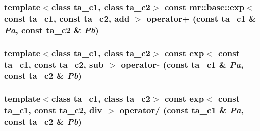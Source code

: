 \subsubsection{\setlength{\rightskip}{0pt plus 5cm}template$<$class ta\_\-c1, class ta\_\-c2$>$ const {\bf mr::base::exp}$<$ const ta\_\-c1, const ta\_\-c2, {\bf add} $>$ operator+ (const ta\_\-c1 \& {\em Pa}, const ta\_\-c2 \& {\em Pb})\hspace{0.3cm}{\tt  [inline]}}\label{namespacemr_1_1base_a0}


\subsubsection{\setlength{\rightskip}{0pt plus 5cm}template$<$class ta\_\-c1, class ta\_\-c2$>$ const {\bf exp}$<$ const ta\_\-c1, const ta\_\-c2, {\bf sub} $>$ operator- (const ta\_\-c1 \& {\em Pa}, const ta\_\-c2 \& {\em Pb})\hspace{0.3cm}{\tt  [inline]}}\label{namespacemr_1_1base_a1}


\subsubsection{\setlength{\rightskip}{0pt plus 5cm}template$<$class ta\_\-c1, class ta\_\-c2$>$ const {\bf exp}$<$ const ta\_\-c1, const ta\_\-c2, {\bf div} $>$ operator/ (const ta\_\-c1 \& {\em Pa}, const ta\_\-c2 \& {\em Pb})\hspace{0.3cm}{\tt  [inline]}}\label{namespacemr_1_1base_a3}


